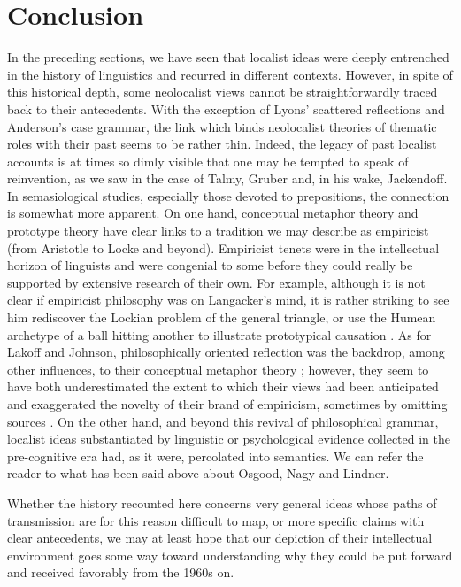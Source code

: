 \documentclass[output=paper]{langscibook}
\begin{document}
\section{Conclusion}

In the preceding sections, we have seen that localist ideas were deeply entrenched in the history of linguistics and recurred in different contexts. However, in spite of this historical depth, some neolocalist views cannot be straightforwardly traced back to their antecedents. With the exception of Lyons’ scattered reflections and Anderson’s case grammar, the link which binds neolocalist theories of thematic roles with their past seems to be rather thin. Indeed, the legacy of past localist accounts is at times so dimly visible that one may be tempted to speak of reinvention, as we saw in the case of Talmy, Gruber and, in his wake, Jackendoff. In semasiological studies, especially those devoted to prepositions, the connection is somewhat more apparent. On one hand, conceptual metaphor theory and prototype theory have clear links to a tradition we may describe as empiricist (from Aristotle to Locke and beyond). Empiricist tenets were in the intellectual horizon of linguists and were congenial to some before they could really be supported by extensive research of their own. For example, although it is not clear if empiricist philosophy was on Langacker’s mind, it is rather striking to see him rediscover the Lockian problem of the general triangle, or use the Humean archetype of a ball hitting another to illustrate prototypical causation \citep[13]{Langacker1991}. As for Lakoff and Johnson, philosophically oriented reflection was the backdrop, among other influences, to their conceptual metaphor theory \citep{johnson_introduction:_1981}; however, they seem to have both underestimated the extent to which their views had been anticipated and exaggerated the novelty of their brand of empiricism, sometimes by omitting sources \citep{arigne_prototype_2018}. On the other hand, and beyond this revival of philosophical grammar, localist ideas substantiated by linguistic or psychological evidence collected in the pre-cognitive era had, as it were, percolated into semantics. We can refer the reader to what has been said above about Osgood, Nagy and Lindner. 

Whether the history recounted here concerns very general ideas whose paths of transmission are for this reason difficult to map, or more specific claims with clear antecedents, we may at least hope that our depiction of their intellectual environment goes some way toward understanding why they could be put forward and received favorably from the 1960s on. 


{\sloppy\printbibliography[heading=subbibliography,notkeyword=this]}
\end{document}
